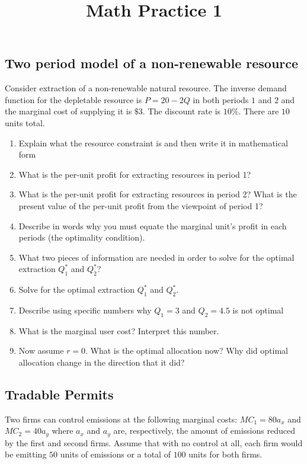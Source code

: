 \documentclass[11pt]{article}
\title{Math Practice 1}
\begin{document}
\subsection*{Two period model of a non-renewable resource}

Consider extraction of a non-renewable natural resource. The inverse demand function for the depletable resource is $P = 20 - 2Q$ in both periods $1$ and $2$ and the marginal cost of supplying it is $\$3$. The discount rate is $10\%$. There are $10$ units total.

\begin{enumerate}
  \item Explain what the resource constraint is and then write it in mathematical form

  \item What is the per-unit profit for extracting resources in period 1? 
  
  \item What is the per-unit profit for extracting resources in period 2? What is the present value of the per-unit profit from the viewpoint of period 1?

  \item Describe in words why you must equate the marginal unit's profit in each periods (the optimality condition). 
  
  \item What two pieces of information are needed in order to solve for the optimal extraction $Q_1^*$ and $Q_2^*$?
  
  \item Solve for the optimal extraction $Q_1^*$ and $Q_2^*$.
  
  \item Describe using specific numbers why $Q_1 = 3$ and $Q_2 = 4.5$ is not optimal

  \item What is the marginal user cost? Interpret this number.

  \item Now assume $r = 0$. What is the optimal allocation now? Why did optimal allocation change in the direction that it did?
\end{enumerate}

\newpage
\subsection*{Tradable Permits}

Two firms can control emissions at the following marginal costs: $MC_1 = 80a_x$ and $MC_2 = 40 a_y$ where $a_x$ and $a_y$ are, respectively, the amount of emissions reduced by the first and second firms. Assume that with no control at all, each firm would be emitting $50$ units of emissions or a total of $100$ units for both firms.
\end{document}

